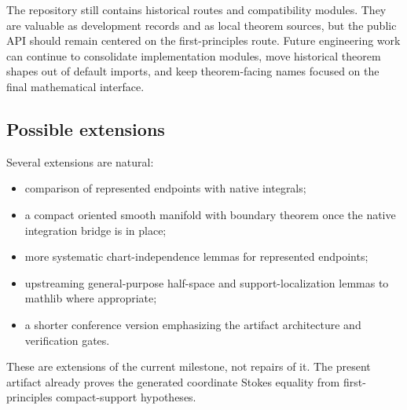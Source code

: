 The repository still contains historical routes and compatibility modules.
They are valuable as development records and as local theorem sources, but the
public API should remain centered on the first-principles route.  Future
engineering work can continue to consolidate implementation modules, move
historical theorem shapes out of default imports, and keep theorem-facing
names focused on the final mathematical interface.

\subsection{Possible extensions}

Several extensions are natural:
\begin{itemize}
  \item comparison of represented endpoints with native integrals;
  \item a compact oriented smooth manifold with boundary theorem once the
  native integration bridge is in place;
  \item more systematic chart-independence lemmas for represented endpoints;
  \item upstreaming general-purpose half-space and support-localization lemmas
  to mathlib where appropriate;
  \item a shorter conference version emphasizing the artifact architecture and
  verification gates.
\end{itemize}

These are extensions of the current milestone, not repairs of it.  The present
artifact already proves the generated coordinate Stokes equality from
first-principles compact-support hypotheses.
